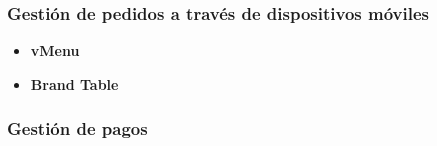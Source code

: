     \subsubsection{Gestión de pedidos a través de dispositivos móviles}
      \begin{itemize}
      \item \textbf{vMenu}
      \item \textbf{Brand Table}
      \end{itemize}
    \subsubsection{Gestión de pagos}

